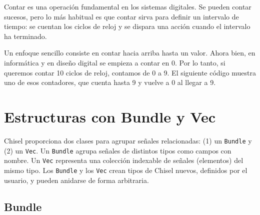 \documentclass[%
    10pt,
    headinclude, footinclude=false,
    openright, %
    notitlepage,
    cleardoublepage=empty,
    headsepline,
    numbers=noenddot,
    bibliography=totoc, index=totoc,
    ]{scrbook}
\newcommand{\code}[1]{{\lstinline[basicstyle=\small\ttfamily]{#1}}}
\begin{document}
Contar es una operación fundamental en los sistemas digitales. Se pueden contar sucesos,
pero lo más habitual es que contar sirva para definir un intervalo de tiempo: se cuentan
los ciclos de reloj y se dispara una acción cuando el intervalo ha terminado.


Un enfoque sencillo consiste en contar hacia arriba hasta un valor. Ahora bien, en informática
y en diseño digital se empieza a contar en 0. Por lo tanto, si queremos contar
10 ciclos de reloj, contamos de 0 a 9. El siguiente código muestra uno de esos contadores, que cuenta
hasta 9 y vuelve a 0 al llegar a 9.


\section{Estructuras con Bundle y Vec}



Chisel proporciona dos clases para agrupar señales relacionadas: (1) un \code{Bundle} y (2) un \code{Vec}.
Un \code{Bundle} agrupa señales de distintos tipos como campos con nombre.
Un \code{Vec} representa una colección indexable de señales (elementos) del mismo tipo.
Los \code{Bundle} y los \code{Vec} crean tipos de Chisel nuevos, definidos por el usuario, y pueden anidarse
de forma arbitraria.

\subsection{Bundle}

\end{document}
